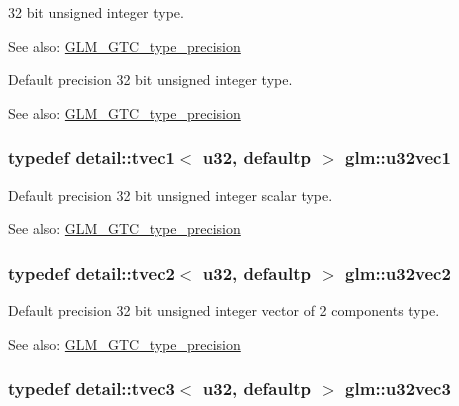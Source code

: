32 bit unsigned integer type. \begin{Desc}
\item[See also:]\hyperlink{group__gtc__type__precision}{GLM\_\-GTC\_\-type\_\-precision}\end{Desc}
Default precision 32 bit unsigned integer type. \begin{Desc}
\item[See also:]\hyperlink{group__gtc__type__precision}{GLM\_\-GTC\_\-type\_\-precision} \end{Desc}
\hypertarget{group__gtc__type__precision_gc8263c8c0bb36bc5c3d109f508e0fb41}{
\subsubsection[u32vec1]{\setlength{\rightskip}{0pt plus 5cm}typedef detail::tvec1$<$ u32, defaultp $>$ {\bf glm::u32vec1}}}
\label{group__gtc__type__precision_gc8263c8c0bb36bc5c3d109f508e0fb41}


Default precision 32 bit unsigned integer scalar type. \begin{Desc}
\item[See also:]\hyperlink{group__gtc__type__precision}{GLM\_\-GTC\_\-type\_\-precision} \end{Desc}
\hypertarget{group__gtc__type__precision_ga543e17450ca67dee12e2c41badfb3a7}{
\subsubsection[u32vec2]{\setlength{\rightskip}{0pt plus 5cm}typedef detail::tvec2$<$ u32, defaultp $>$ {\bf glm::u32vec2}}}
\label{group__gtc__type__precision_ga543e17450ca67dee12e2c41badfb3a7}


Default precision 32 bit unsigned integer vector of 2 components type. \begin{Desc}
\item[See also:]\hyperlink{group__gtc__type__precision}{GLM\_\-GTC\_\-type\_\-precision} \end{Desc}
\hypertarget{group__gtc__type__precision_g7c88634a005904a441cba739d7cc4055}{
\subsubsection[u32vec3]{\setlength{\rightskip}{0pt plus 5cm}typedef detail::tvec3$<$ u32, defaultp $>$ {\bf glm::u32vec3}}}
\label{group__gtc__type__precision_g7c88634a005904a441cba739d7cc4055}


